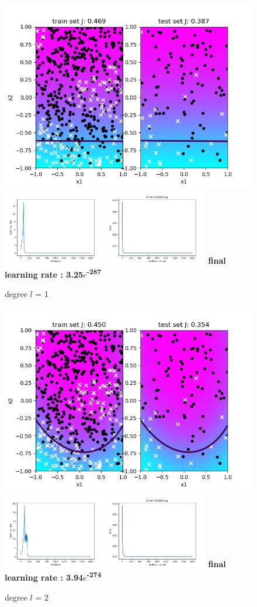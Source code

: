 \documentclass[a4paper]{article}
\begin{document}
\begin{figure}[h]	
	\includegraphics[width=0.4	\textwidth]{logreg_deg1_iter20000.png}
	\includegraphics[width=0.4\textwidth]{logreg_deg1_iter20000_learn.png}
	\includegraphics[width=0.4\textwidth]{logreg_deg1_iter20000_error.png}
	\textbf{final learning rate : 3.25$e$\textsuperscript{-287}}
	\caption{degree $l$ = 1}
\end{figure}
	\begin{figure}[h]	
	\includegraphics[width=0.4	\textwidth]{logreg_deg2_iter2000.png}
	\includegraphics[width=0.4\textwidth]{logreg_deg2_iter2000_learn.png}
	\includegraphics[width=0.4\textwidth]{logreg_deg2_iter2000_error.png}
	\textbf{final learning rate : 3.94$e$\textsuperscript{-274}}
	\caption{degree $l$ = 2}
\end{figure}
\end{document}
